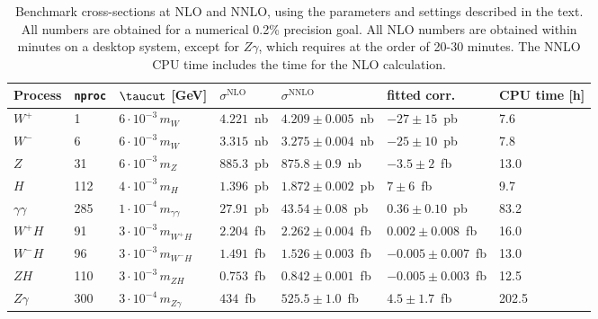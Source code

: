 \begin{table}[]
	\caption{Benchmark cross-sections at NLO and NNLO, using the parameters
		and settings described in the text. All numbers are obtained for a numerical 0.2\% precision goal.
	All NLO numbers are obtained within minutes on a desktop system, except for $Z\gamma$, which requires at the 
	order of 20-30 minutes. The NNLO CPU time includes the time for the NLO calculation.}
	\label{NNLObenchmarks} 
	\vspace{0.5em}
	\begin{tabular}{lllllll}
		\hline
		Process & \texttt{nproc} & $\taucut$ [GeV] & $\sigma^{\text{NLO}}$ & $\sigma^{\text{NNLO}}$ & fitted corr. & CPU time [h]\\
                \hline 
	       $W^+$ &  1 &   $6\cdot10^{-3}\, m_W$  &  $4.221$~nb & $4.209\pm 0.005$~nb & $-27\pm 15$~pb  & 7.6 \\	      
	       $W^-$ &  6 &   $6\cdot10^{-3}\, m_W$ & $3.315$~nb & $3.275\pm 0.004$~nb & $-25\pm 10$~pb & 7.8 \\
	       $Z$   &  31 &   $6\cdot10^{-3}\, m_Z$ & $885.3$~pb & $875.8\pm 0.9$~nb & $-3.5\pm  2$~fb & 13.0 \\
	       $H$   &  112 &	$4\cdot10^{-3}\, m_H$ & $1.396$~pb & $1.872\pm 0.002$~pb & $7\pm 6$~fb & 9.7 \\
	       $\gamma\gamma$	&  285 &   $1\cdot10^{-4}\, m_{\gamma\gamma}$ & $27.91$~pb & $43.54\pm 0.08$~pb & $0.36\pm 0.10$~pb & 83.2 \\
	       $W^+ H$   &  91 &   $3\cdot10^{-3}\, m_{W^+ H}$ & $2.204$~fb & $2.262\pm 0.004$~fb & $0.002\pm 0.008$~fb & 16.0 \\
	       $W^- H$   &  96 &   $3\cdot10^{-3}\, m_{W^- H}$ & $1.491$~fb & $1.526\pm 0.003$~fb & $-0.005\pm 0.007$~fb & 13.0 \\
	       $Z H$   &  110 &   $3\cdot10^{-3}\, m_{Z H}$ & $0.753$~fb & $0.842\pm 0.001$~fb & $-0.005\pm 0.003$~fb & 12.5 \\
	       $Z \gamma$   &  300 &   $3\cdot10^{-4}\, m_{Z \gamma}$ & $434$~fb & $525.5\pm 1.0$~fb & $4.5\pm 1.7$~fb & 202.5 \\
	 \hline
	\end{tabular}
\end{table}
